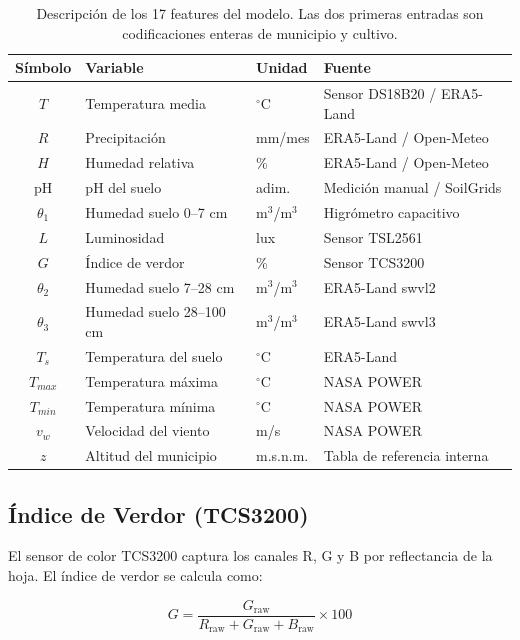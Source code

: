\documentclass[12pt, a4paper]{article}
\begin{document}
\begin{table}[h!]
\centering
\begin{tabular}{clll}
\toprule
\textbf{Símbolo} & \textbf{Variable} & \textbf{Unidad} & \textbf{Fuente} \\
\midrule
$T$        & Temperatura media       & $^\circ$C     & Sensor DS18B20 / ERA5-Land \\
$R$        & Precipitación           & mm/mes        & ERA5-Land / Open-Meteo \\
$H$        & Humedad relativa        & \%            & ERA5-Land / Open-Meteo \\
$\text{pH}$ & pH del suelo           & adim.         & Medición manual / SoilGrids \\
$\theta_1$ & Humedad suelo 0--7 cm   & m$^3$/m$^3$   & Higrómetro capacitivo \\
$L$        & Luminosidad             & lux           & Sensor TSL2561 \\
$G$        & Índice de verdor        & \%            & Sensor TCS3200 \\
$\theta_2$ & Humedad suelo 7--28 cm  & m$^3$/m$^3$   & ERA5-Land swvl2 \\
$\theta_3$ & Humedad suelo 28--100 cm & m$^3$/m$^3$  & ERA5-Land swvl3 \\
$T_s$      & Temperatura del suelo   & $^\circ$C     & ERA5-Land \\
$T_{max}$  & Temperatura máxima      & $^\circ$C     & NASA POWER \\
$T_{min}$  & Temperatura mínima      & $^\circ$C     & NASA POWER \\
$v_w$      & Velocidad del viento    & m/s           & NASA POWER \\
$z$        & Altitud del municipio   & m.s.n.m.      & Tabla de referencia interna \\
\bottomrule
\end{tabular}
\caption{Descripción de los 17 features del modelo. Las dos primeras entradas son codificaciones enteras de municipio y cultivo.}
\end{table}

\subsection{Índice de Verdor (TCS3200)}

El sensor de color TCS3200 captura los canales R, G y B por reflectancia de la hoja. El índice de verdor se calcula como:

\begin{equation}
  G = \frac{G_{\text{raw}}}{R_{\text{raw}} + G_{\text{raw}} + B_{\text{raw}}} \times 100
  \label{eq:greenness}
\end{equation}
\end{document}
